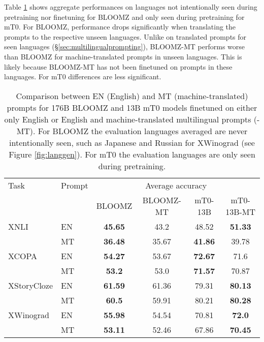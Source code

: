 \documentclass[11pt]{article}
\begin{document}
Table \ref{tab:promptlangl2} shows aggregate performances on languages not intentionally seen during pretraining nor finetuning for BLOOMZ and only seen during pretraining for mT0. For BLOOMZ, performance drops significantly when translating the prompts to the respective unseen languages. Unlike on translated prompts for seen languages (\S\ref{sec:multilingualprompting}), BLOOMZ-MT performs worse than BLOOMZ for machine-translated prompts in unseen languages. This is likely because BLOOMZ-MT has not been finetuned on prompts in these languages. For mT0 differences are less significant.

\begin{table}[htbp]
    \small
    \begin{center}
            \begin{tabular}{ll|cc|cc}
\toprule
Task & Prompt & \multicolumn{4}{c}{Average accuracy} \\
     &        & BLOOMZ & BLOOMZ-MT & mT0-13B & mT0-13B-MT \\
\midrule
XNLI & EN & \textbf{45.65} & 43.2 & 48.52 & \textbf{51.33} \\
 & MT & \textbf{36.48} & 35.67 & \textbf{41.86} & 39.78 \\
\midrule
XCOPA & EN & \textbf{54.27} & 53.67 & \textbf{72.67} & 71.6 \\
 & MT & \textbf{53.2} & 53.0 & \textbf{71.57} & 70.87\\
\midrule
XStoryCloze & EN & \textbf{61.59} & 61.36 & 79.31 & \textbf{80.13} \\
 & MT & \textbf{60.5} & 59.91 & 80.21 & \textbf{80.28}\\
\midrule
XWinograd & EN & \textbf{55.98} & 54.54 & 70.81 & \textbf{72.0} \\
 & MT & \textbf{53.11} & 52.46 & 67.86 & \textbf{70.45} \\
\bottomrule
            \end{tabular}
    \caption{Comparison between EN (English) and MT (machine-translated) prompts for 176B BLOOMZ and 13B mT0 models finetuned on either only English or English and machine-translated multilingual prompts (-MT). For BLOOMZ the evaluation languages averaged are never intentionally seen, such as Japanese and Russian for XWinograd (see Figure \ref{fig:langgen}). For mT0 the evaluation languages are only seen during pretraining.}
    \label{tab:promptlangl2}
    \end{center}
\end{table}

 
\FloatBarrier
\end{document}

